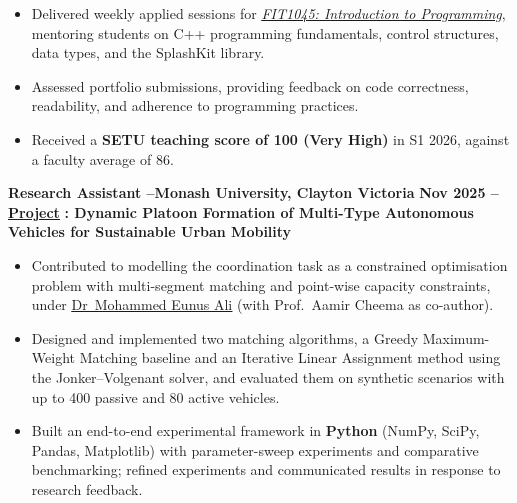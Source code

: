 \documentclass[11pt, a4paper]{article}
\let\hrefnoul\href
\renewcommand{\href}[2]{\hrefnoul{#1}{\ul{#2}}}
\begin{document}
\begin{itemize}[leftmargin=1.5em, itemsep=2pt, topsep=1pt, parsep=0pt]
  \item Delivered weekly applied sessions for \href{https://handbook.monash.edu/2025/units/fit1045}{\textit{FIT1045: Introduction to Programming}},
        mentoring students on C++ programming fundamentals, control structures, data types,
        and the SplashKit library.

  \item Assessed portfolio submissions, providing feedback on code correctness, readability,
        and adherence to programming practices.

  \item Received a \textbf{SETU teaching score of 100 (Very High)} in S1 2026, against a faculty
        average of 86.
\end{itemize}

\vspace{4pt}
\noindent\textbf{Research Assistant –\quad Monash University, Clayton Victoria}%
\hfill\textbf{Nov 2025 –}\\
\href{https://supervisorconnect.it.monash.edu/projects/research/autonomous-vehicles-urban-transit-optimisation}{\textbf{Project}}%
\textbf{: Dynamic Platoon Formation of Multi-Type Autonomous Vehicles for Sustainable Urban Mobility}

\begin{itemize}[leftmargin=1.5em, itemsep=2pt, topsep=1pt, parsep=0pt]
  \item Contributed to modelling the coordination task as a constrained optimisation problem
        with multi-segment matching and point-wise capacity constraints, under
        \href{https://research.monash.edu/en/persons/eunus-ali}{Dr~Mohammed Eunus Ali}
        (with Prof.~Aamir Cheema as co-author).

  \item Designed and implemented two matching algorithms, a Greedy Maximum-Weight Matching
        baseline and an Iterative Linear Assignment method using the Jonker--Volgenant solver,
        and evaluated them on synthetic scenarios with up to 400 passive and 80 active vehicles.

  \item Built an end-to-end experimental framework in \textbf{Python} (NumPy, SciPy, Pandas,
        Matplotlib) with parameter-sweep experiments and comparative benchmarking; refined
        experiments and communicated results in response to research feedback.
\end{itemize}
\end{document}
